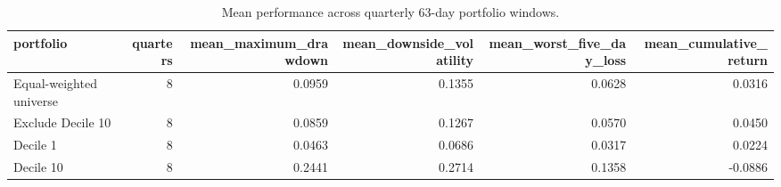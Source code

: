 \begin{table}
\caption{Mean performance across quarterly 63-day portfolio windows.}
\label{tab:fragility-portfolio-event-windows}
\begin{tabular}{lrrrrr}
\toprule
portfolio & quarters & mean_maximum_drawdown & mean_downside_volatility & mean_worst_five_day_loss & mean_cumulative_return \\
\midrule
Equal-weighted universe & 8 & 0.0959 & 0.1355 & 0.0628 & 0.0316 \\
Exclude Decile 10 & 8 & 0.0859 & 0.1267 & 0.0570 & 0.0450 \\
Decile 1 & 8 & 0.0463 & 0.0686 & 0.0317 & 0.0224 \\
Decile 10 & 8 & 0.2441 & 0.2714 & 0.1358 & -0.0886 \\
\bottomrule
\end{tabular}
\end{table}
